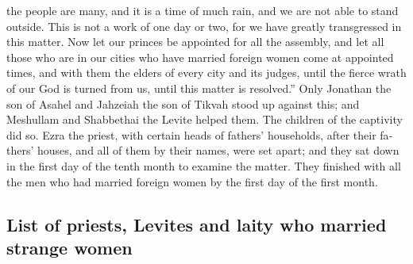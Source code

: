 \begin{paracol}{2}
\begin{otherlanguage}{english}
the people are many, and it is a time of much rain, and we are not able
to stand outside. This is not a work of one day or two, for we have
greatly transgressed in this matter.  Now let our princes
be appointed for all the assembly, and let all those who are in our
cities who have married foreign women come at appointed times, and with
them the elders of every city and its judges, until the fierce wrath of
our God is turned from us, until this matter is resolved.''
 Only Jonathan the son of Asahel and Jahzeiah the son of
Tikvah stood up against this; and Meshullam and Shabbethai the Levite
helped them.  The children of the captivity did so. Ezra
the priest, with certain heads of fathers' households, after their
fathers' houses, and all of them by their names, were set apart; and
they sat down in the first day of the tenth month to examine the matter.
 They finished with all the men who had married foreign
women by the first day of the first month.

\hypertarget{list-of-priests-levites-and-laity-who-married-strange-women}{%
\subsection{List of priests, Levites and laity who married strange
women}\label{list-of-priests-levites-and-laity-who-married-strange-women}}


\end{otherlanguage}
\end{paracol}
